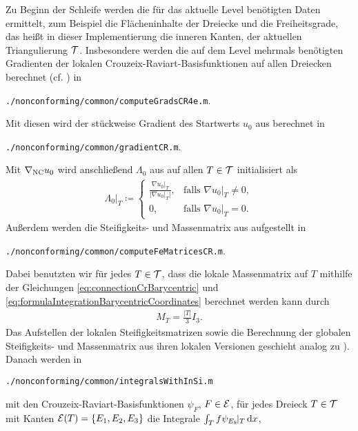 Zu Beginn der Schleife werden die für das aktuelle Level benötigten Daten
ermittelt, zum Beispiel die Flächeninhalte der Dreiecke und die Freiheitsgrade,
das heißt in dieser Implementierung die inneren Kanten, der aktuellen
Triangulierung $\mathcal{T}$. 
Insbesondere werden die auf dem Level mehrmals benötigten Gradienten der
lokalen Crouzeix-Raviart-Basisfunktionen auf allen Dreiecken berechnet (cf.
\cite[Abschnitt 1.4.2]{CGKNRR10}) in
\begin{center}
  \texttt{./nonconforming/common/computeGradsCR4e.m}.
\end{center}
Mit diesen wird der stückweise Gradient des Startwerts $u_0$ aus
 berechnet in
\begin{center}
  \texttt{./nonconforming/common/gradientCR.m}.
\end{center}
Mit $\nabla_\textup{NC} u_0$ wird anschließend $\Lambda_0$ aus
 auf allen $T\in\mathcal{T}$ initialisiert als 
\begin{align*}
  \Lambda_0|_T\coloneqq
  \begin{cases}
    \frac{\nabla u_0|_T}{|\nabla u_0|_T|},&\text{falls }\nabla u_0|_T\neq 0,\\
    0,&\text{falls }\nabla u_0|_T= 0.
  \end{cases}
\end{align*}
Außerdem werden die Steifigkeits- und Massenmatrix aus
 aufgestellt in
\begin{center}
  \texttt{./nonconforming/common/computeFeMatricesCR.m}.
\end{center}
Dabei benutzten wir für jedes $T\in\mathcal{T}$, dass die lokale Massenmatrix auf
$T$ mithilfe der Gleichungen
\eqref{eq:connectionCrBarycentric} und
\eqref{eq:formulaIntegrationBarycentricCoordinates}
berechnet werden kann durch
\begin{align}
  \label{eq:localMassmatrix}
  M_T
  =
  \frac{|T|}{3}I_3.
\end{align}
Das Aufstellen der lokalen Steifigkeitsmatrizen sowie die Berechnung der
globalen Stei\-fig\-keits- und Massenmatrix aus ihren lokalen Versionen geschieht
analog zu \cite[Abschnitt 1.4.2]{CGKNRR10}).
Danach werden in
\begin{center}
  \texttt{./nonconforming/common/integralsWithInSi.m}
\end{center}
mit den Crouzeix-Raviart-Basisfunktionen
$\psi_F$, $F\in\mathcal{E}$, für jedes Dreieck $T\in\mathcal{T}$ mit Kanten
$\mathcal{E}(T)=\{E_1,E_2,E_3\}$ die Integrale $\int_T f\psi_{E_k}\!|_T\,\mathrm{d}x$,
